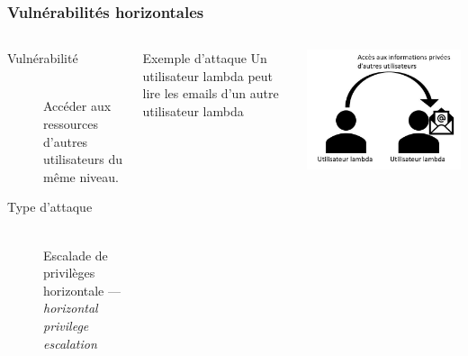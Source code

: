 \documentclass[aspectratio=169]{beamer}  %
\begin{document}
\begin{frame}
  \frametitle{Vulnérabilités horizontales}
  \begin{columns}[c]
      \begin{description}
        \item[Vulnérabilité] \hfill \\ Accéder aux ressources d'autres utilisateurs du même niveau.
        \item[Type d'attaque] \hfill \\ Escalade de privilèges horizontale --- \emph{horizontal privilege escalation}
      \end{description}
      \begin{block}{Exemple d'attaque}
        Un utilisateur lambda peut lire les emails d'un autre utilisateur lambda
      \end{block}
      \begin{center}
        \includegraphics[width=\textwidth]{escalade-hor}
      \end{center} 
  \end{columns}
\end{frame}
\end{document}
